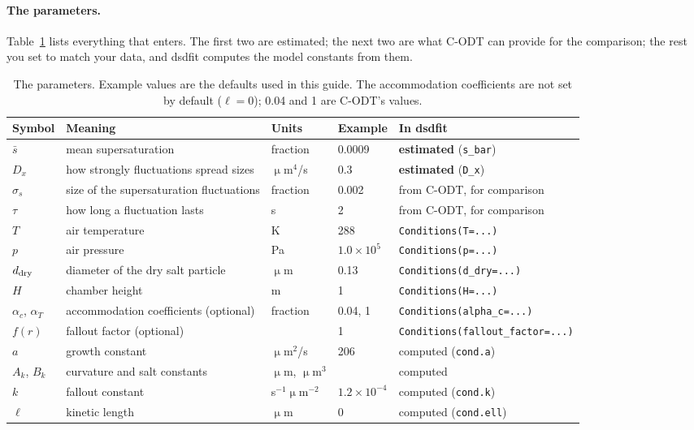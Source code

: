 \documentclass[11pt]{article}
\newcommand{\sbar}{\bar s}
\newcommand{\Dx}{D_x}
\newcommand{\code}[1]{\texttt{#1}}
\begin{document}
\paragraph{The parameters.} Table~\ref{tab:params} lists everything that enters. The first two are
estimated; the next two are what C-ODT can provide for the comparison; the rest you set to match your
data, and dsdfit computes the model constants from them.

\begin{table}[h]
\centering\small
\begin{tabularx}{\textwidth}{l X l l l}
\toprule
Symbol & Meaning & Units & Example & In dsdfit \\
\midrule
$\sbar$ & mean supersaturation & fraction & 0.0009 & \textbf{estimated} (\code{s\_bar}) \\
$\Dx$ & how strongly fluctuations spread sizes & $\upmu$m$^4$/s & 0.3 & \textbf{estimated} (\code{D\_x}) \\
\midrule
$\sigma_s$ & size of the supersaturation fluctuations & fraction & 0.002 & from C-ODT, for comparison \\
$\tau$ & how long a fluctuation lasts & s & 2 & from C-ODT, for comparison \\
\midrule
$T$ & air temperature & K & 288 & \code{Conditions(T=...)} \\
$p$ & air pressure & Pa & $1.0\times10^5$ & \code{Conditions(p=...)} \\
$d_{\rm dry}$ & diameter of the dry salt particle & $\upmu$m & 0.13 & \code{Conditions(d\_dry=...)} \\
$H$ & chamber height & m & 1 & \code{Conditions(H=...)} \\
$\alpha_c$, $\alpha_T$ & accommodation coefficients (optional) & fraction & 0.04, 1 & \code{Conditions(alpha\_c=...)} \\
$f(r)$ & fallout factor (optional) & & 1 & \code{Conditions(fallout\_factor=...)} \\
\midrule
$a$ & growth constant & $\upmu$m$^2$/s & 206 & computed (\code{cond.a}) \\
$A_k$, $B_k$ & curvature and salt constants & $\upmu$m, $\upmu$m$^3$ & & computed \\
$k$ & fallout constant & s$^{-1}\upmu$m$^{-2}$ & $1.2\times10^{-4}$ & computed (\code{cond.k}) \\
$\ell$ & kinetic length & $\upmu$m & 0 & computed (\code{cond.ell}) \\
\bottomrule
\end{tabularx}
\caption{The parameters. Example values are the defaults used in this guide. The accommodation coefficients
are not set by default ($\ell = 0$); 0.04 and 1 are C-ODT's values.}
\label{tab:params}
\end{table}
\end{document}

